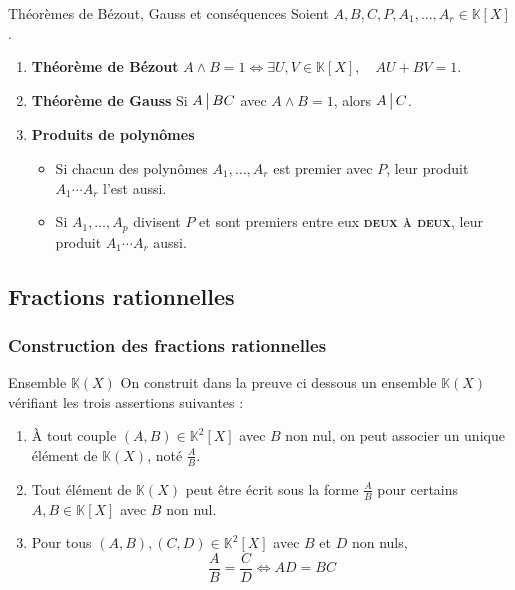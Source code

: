    \begin{theo}{Théorèmes de Bézout, Gauss et conséquences}{}
        Soient $A,B,C,P,A_1,\ldots,A_r \in \mathbb{K}[X]$.
        \begin{enumerate}
            \item \textbf{Théorème de Bézout} \quad $A \wedge B = 1 \iff \exists U,V \in \mathbb{K}[X], \quad AU + BV = 1$.
            \item \textbf{Théorème de Gauss} \quad Si $A \, \big| \, BC$ avec $A \wedge B = 1$, alors $A \, \big| \, C$.
            \item \textbf{Produits de polynômes} 
            \begin{itemize}
                \item Si chacun des polynômes $A_1,\ldots,A_r$ est premier avec $P$, leur produit $A_1 \cdots A_r$ l’est aussi.
                \item Si $A_1,\ldots,A_p$ divisent $P$ et sont premiers entre eux \textsc{\textbf{deux à deux}}, leur produit $A_1 \cdots A_r$ aussi.
            \end{itemize}
        \end{enumerate}
    \end{theo}

\subsection{Fractions rationnelles}

    \subsubsection{Construction des fractions rationnelles}

    \begin{defi}{Ensemble $\mathbb{K}(X)$}{}
        On construit dans la preuve ci dessous un ensemble $\mathbb{K}(X)$ vérifiant les trois assertions suivantes :
        \begin{enumerate}[label=\textcolor{myyellow}{\textbf{(\arabic*)}}]
            \item À tout couple $(A,B) \in \mathbb{K}^2[X]$ avec $B$ non nul, on peut associer un unique élément de $\mathbb{K}(X)$, noté $\frac{A}{B}$.
            \item Tout élément de $\mathbb{K}(X)$ peut être écrit sous la forme $\frac{A}{B}$ pour certains $A,B \in \mathbb{K}[X]$ avec $B$ non nul.
            \item Pour tous $(A,B), (C,D) \in \mathbb{K}^2[X]$ avec $B$ et $D$ non nuls, 
            \[ \frac{A}{B} = \frac{C}{D} \iff AD = BC \]
        \end{enumerate}
    \end{defi}

